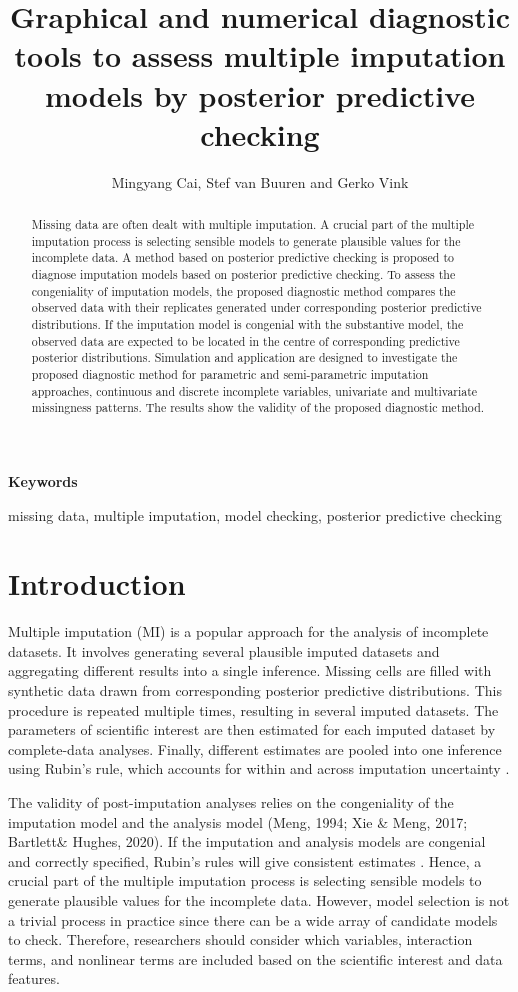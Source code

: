 \documentclass[12pt, fullpage, a4paper]{article}
\begin{document}
\title{Graphical and numerical diagnostic tools to assess multiple imputation models by posterior predictive checking}
\author{Mingyang Cai, Stef van Buuren and Gerko Vink}
\date{}
\maketitle
\begin{abstract}
Missing data are often dealt with multiple imputation. A crucial part of the multiple imputation process is selecting sensible models to generate plausible values for the incomplete data. A method based on posterior predictive checking is proposed to diagnose imputation models based on posterior predictive checking. To assess the congeniality of imputation models, the proposed diagnostic method compares the observed data with their replicates generated under corresponding posterior predictive distributions. If the imputation model is congenial with the substantive model, the observed data are expected to be located in the centre of corresponding predictive posterior distributions. Simulation and application are designed to investigate the proposed diagnostic method for parametric and semi-parametric imputation approaches, continuous and discrete incomplete variables, univariate and multivariate missingness patterns. The results show the validity of the proposed diagnostic method.  	
\end{abstract}

\textbf{Keywords}

missing data, multiple imputation, model checking, posterior predictive checking
\section{Introduction}
Multiple imputation (MI) is a popular approach for the analysis of incomplete datasets. It involves generating several plausible imputed datasets and aggregating different results into a single inference. Missing cells are filled with synthetic data drawn from corresponding posterior predictive distributions. This procedure is repeated multiple times, resulting in several imputed datasets. The parameters of scientific interest are then estimated for each imputed dataset by complete-data analyses. Finally, different estimates are pooled into one inference using Rubin's rule, which accounts for within and across imputation uncertainty \cite{RubinD1987}.  

The validity of post-imputation analyses relies on the congeniality of the imputation model and the analysis model (Meng, 1994\nocite{meng1994multiple}; Xie \& Meng, 2017\nocite{xie2017dissecting}; Bartlett\& Hughes, 2020\nocite{bartlett2020bootstrap}). If the imputation and analysis models are congenial and correctly specified, Rubin’s rules will give consistent estimates \cite{RubinD1987}. Hence, a crucial part of the multiple imputation process is selecting sensible models to generate plausible values for the incomplete data. However, model selection is not a trivial process in practice since there can be a wide array of candidate models to check. Therefore, researchers should consider which variables, interaction terms, and nonlinear terms are included based on the scientific interest and data features. 
\end{document}
